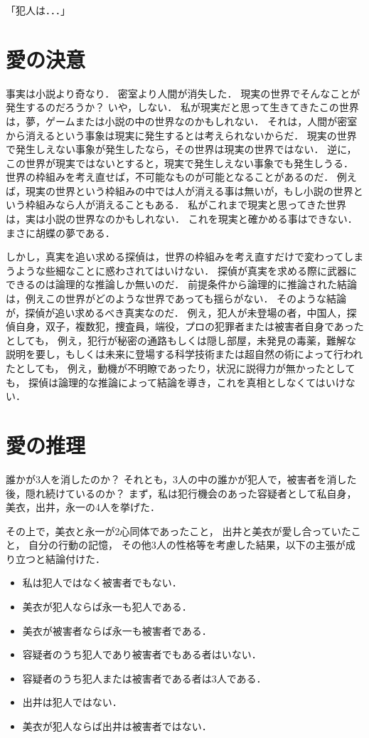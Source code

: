 「犯人は．．．」

\section{愛の決意}
事実は小説より奇なり．
密室より人間が消失した．
現実の世界でそんなことが発生するのだろうか？
いや，しない．
私が現実だと思って生きてきたこの世界は，夢，ゲームまたは小説の中の世界なのかもしれない．
それは，人間が密室から消えるという事象は現実に発生するとは考えられないからだ．
現実の世界で発生しえない事象が発生したなら，その世界は現実の世界ではない．
逆に，この世界が現実ではないとすると，現実で発生しえない事象でも発生しうる．
世界の枠組みを考え直せば，不可能なものが可能となることがあるのだ．
例えば，現実の世界という枠組みの中では人が消える事は無いが，もし小説の世界という枠組みなら人が消えることもある．
私がこれまで現実と思ってきた世界は，実は小説の世界なのかもしれない．
これを現実と確かめる事はできない．
まさに胡蝶の夢である．

しかし，真実を追い求める探偵は，世界の枠組みを考え直すだけで変わってしまうような些細なことに惑わされてはいけない．
探偵が真実を求める際に武器にできるのは論理的な推論しか無いのだ．
前提条件から論理的に推論された結論は，例えこの世界がどのような世界であっても揺らがない．
そのような結論が，探偵が追い求めるべき真実なのだ．
例え，犯人が未登場の者，中国人，探偵自身，双子，複数犯，捜査員，端役，プロの犯罪者または被害者自身であったとしても，
例え，犯行が秘密の通路もしくは隠し部屋，未発見の毒薬，難解な説明を要し，もしくは未来に登場する科学技術または超自然の術によって行われたとしても，
例え，動機が不明瞭であったり，状況に説得力が無かったとしても，
探偵は論理的な推論によって結論を導き，これを真相としなくてはいけない．

\section{愛の推理}
誰かが3人を消したのか？
それとも，3人の中の誰かが犯人で，被害者を消した後，隠れ続けているのか？
まず，私は犯行機会のあった容疑者として私自身，美衣，出井，永一の4人を挙げた．

その上で，美衣と永一が2心同体であったこと，
出井と美衣が愛し合っていたこと，
自分の行動の記憶，
その他3人の性格等を考慮した結果，以下の主張が成り立つと結論付けた．
\begin{itemize}
\item 私は犯人ではなく被害者でもない．
\item 美衣が犯人ならば永一も犯人である．
\item 美衣が被害者ならば永一も被害者である．
\item 容疑者のうち犯人であり被害者でもある者はいない．
\item 容疑者のうち犯人または被害者である者は3人である．
\item 出井は犯人ではない．
\item 美衣が犯人ならば出井は被害者ではない．
\end{itemize}

